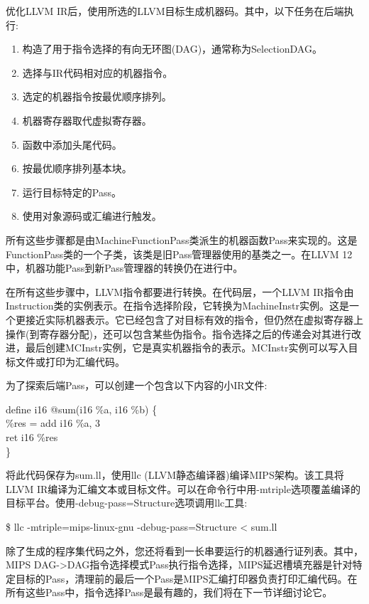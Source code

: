 优化LLVM IR后，使用所选的LLVM目标生成机器码。其中，以下任务在后端执行:\par

\begin{enumerate}
\item 构造了用于指令选择的有向无环图(DAG)，通常称为SelectionDAG。
\item 选择与IR代码相对应的机器指令。
\item 选定的机器指令按最优顺序排列。
\item 机器寄存器取代虚拟寄存器。
\item 函数中添加头尾代码。
\item 按最优顺序排列基本块。
\item 运行目标特定的Pass。
\item 使用对象源码或汇编进行触发。
\end{enumerate}

所有这些步骤都是由MachineFunctionPass类派生的机器函数Pass来实现的。这是FunctionPass类的一个子类，该类是旧Pass管理器使用的基类之一。在LLVM 12中，机器功能Pass到新Pass管理器的转换仍在进行中。\par

在所有这些步骤中，LLVM指令都要进行转换。在代码层，一个LLVM IR指令由Instruction类的实例表示。在指令选择阶段，它转换为MachineInstr实例。这是一个更接近实际机器表示。它已经包含了对目标有效的指令，但仍然在虚拟寄存器上操作(到寄存器分配)，还可以包含某些伪指令。指令选择之后的传递会对其进行改进，最后创建MCInstr实例，它是真实机器指令的表示。MCInstr实例可以写入目标文件或打印为汇编代码。\par

为了探索后端Pass，可以创建一个包含以下内容的小IR文件:\par

\begin{tcolorbox}[colback=white,colframe=black]
define i16 @sum(i16 \%a, i16 \%b) \{ \\
\hspace*{0.5cm}\%res = add i16 \%a, 3 \\
\hspace*{0.5cm}ret i16 \%res \\
\}
\end{tcolorbox}

将此代码保存为sum.ll，使用llc (LLVM静态编译器)编译MIPS架构。该工具将LLVM IR编译为汇编文本或目标文件。可以在命令行中用-mtriple选项覆盖编译的目标平台。使用-debug-pass=\allowbreak Structure选项调用llc工具:\par

\begin{tcolorbox}[colback=white,colframe=black]
\$ llc -mtriple=mips-linux-gnu -debug-pass=Structure < sum.ll
\end{tcolorbox}

除了生成的程序集代码之外，您还将看到一长串要运行的机器通行证列表。其中，MIPS DAG->\allowbreak DAG指令选择模式Pass执行指令选择，MIPS延迟槽填充器是针对特定目标的Pass，清理前的最后一个Pass是MIPS汇编打印器负责打印汇编代码。在所有这些Pass中，指令选择Pass是最有趣的，我们将在下一节详细讨论它。\par












